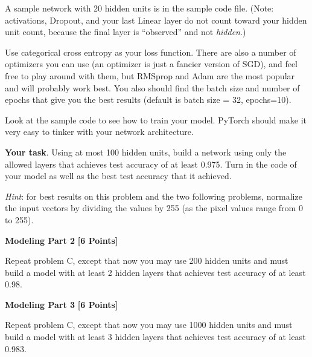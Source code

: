 A sample network with 20 hidden units is in the sample code file. (Note: activations, Dropout, and your last Linear layer do not count toward your hidden unit count, because the final layer is ``observed'' and not \emph{hidden}.)

Use categorical cross entropy as your loss function. There are also a number of optimizers  you can use (an optimizer is just a fancier version of SGD), and feel free to play around with them, but RMSprop and Adam are the most popular and will probably work best. You also should find the batch size and number of epochs that give you the best results (default is batch size = 32, epochs=10).

Look at the sample code to see how to train your model. PyTorch should make it very easy to tinker with your network architecture.

\textbf{Your task}. Using at most 100 hidden units, build a network using only the allowed layers that achieves test accuracy of at least 0.975. Turn in the code of your model as well as the best test accuracy that it achieved.

\textit{Hint}: for best results on this problem and the two following problems, normalize the input vectors by dividing the values by 255 (as the pixel values range from 0 to 255).

\begin{solution}

\end{solution}

\newpage


 \problem \textbf{Modeling Part 2} \textbf{[6 Points]}

 Repeat problem C, except that now you may use 200 hidden units and must build a model with at least 2 hidden layers that achieves test accuracy of at least 0.98.

 \begin{solution}

\end{solution}

\newpage


  \problem \textbf{Modeling Part 3} \textbf{[6 Points]}

  Repeat problem C, except that now you may use 1000 hidden units and must build a model with at least 3 hidden layers that achieves test accuracy of at least 0.983.

  \begin{solution}

\end{solution}

